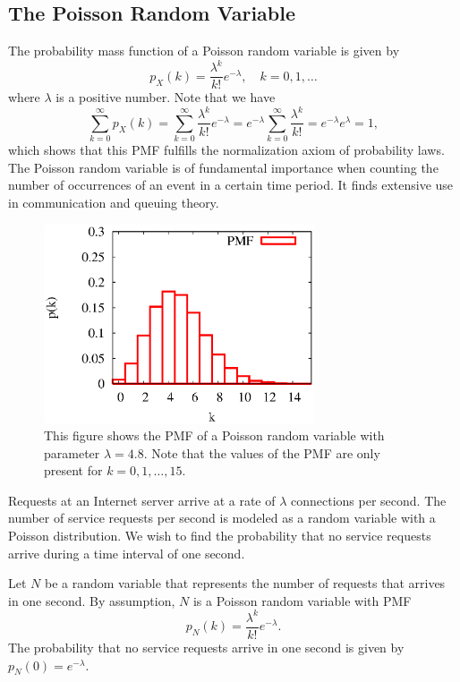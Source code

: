 \subsection{The Poisson Random Variable}

The probability mass function of a Poisson random variable is given by
\begin{equation*}
p_X (k) = \frac{\lambda^k}{k!} e^{- \lambda}, \quad k = 0, 1, \ldots
\end{equation*}
where $\lambda$ is a positive number.
Note that we have
\begin{equation*}
\sum_{k = 0}^{\infty} p_X (k)
= \sum_{k = 0}^{\infty} \frac{\lambda^k}{k!} e^{- \lambda}
= e^{- \lambda} \sum_{k = 0}^{\infty} \frac{\lambda^k}{k!}
= e^{- \lambda} e^{\lambda} = 1 ,
\end{equation*}
which shows that this PMF fulfills the normalization axiom of probability laws.
The Poisson random variable is of fundamental importance when counting the number of occurrences of an event in a certain time period.
It finds extensive use in communication and queuing theory.

\begin{figure}[ht]
\begin{center}
\includegraphics[width=8cm]{Figures/5chapter/poisson}
\caption{This figure shows the PMF of a Poisson random variable with parameter $\lambda = 4.8$.  Note that the values of the PMF are only present for $k = 0, 1, \ldots, 15$.}
\end{center}
\end{figure}

\begin{example}
Requests at an Internet server arrive at a rate of $\lambda$ connections per second.
The number of service requests per second is modeled as a random variable with a Poisson distribution.
We wish to find the probability that no service requests arrive during a time interval of one second.

Let $N$ be a random variable that represents the number of requests that arrives in one second.
By assumption, $N$ is a Poisson random variable with PMF
\begin{equation*}
p_N (k) = \frac{ \lambda^k }{k!} e^{-\lambda} .
\end{equation*}
The probability that no service requests arrive in one second is given by $p_N (0) = e^{-\lambda}$.
\end{example}

